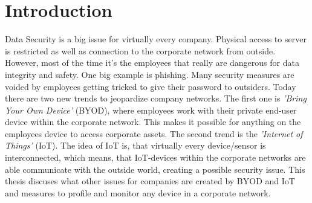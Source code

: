 \chapter{Introduction}
Data Security is a big issue for virtually every company. Physical access to server is restricted as well as connection to the corporate network from outside. However, most of the time it's the employees that really are dangerous for data integrity and safety. One big example is phishing. Many security measures are voided by employees getting tricked to give their password to outsiders. Today there are two new trends to jeopardize company networks. The first one is \textit{'Bring Your Own Device'} (BYOD), where employees work with their private end-user device within the corporate network. This makes it possible for anything on the employees device to access corporate assets. The second trend is the \textit{'Internet of Things'} (IoT). The idea of IoT is, that virtually every device/sensor is interconnected, which means, that IoT-devices within the corporate networks are able communicate with the outside world, creating a possible security issue. This thesis discuses what other issues for companies are created by BYOD and IoT and measures to profile and monitor any device in a corporate network.
